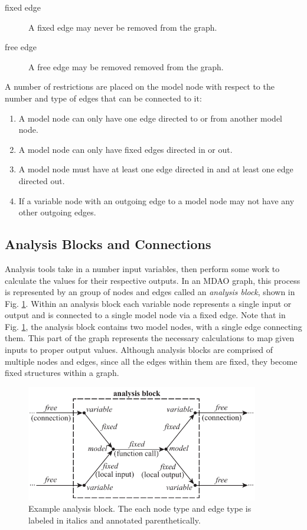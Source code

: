 \begin{description}
\item[fixed edge] A fixed edge may never be removed from the graph.
\item[free edge] A free edge may be removed removed from the graph.
\end{description}

A number of restrictions are placed on the model node with respect to the number and 
type of edges that can be connected to it: 
\begin{enumerate}
\item A model node can only have one edge directed to or from another model node.
\item A model node can only have fixed edges directed in or out.
\item A model node must have at least one edge directed in and at least one edge directed out.
\item If a variable node with an outgoing edge to a model node may not have any other outgoing edges.
\end{enumerate}

\subsection{Analysis Blocks and Connections}

Analysis tools take in a number input variables, then perform some work to calculate 
the values for their respective outputs. In an MDAO graph, this process is 
represented by an group of nodes and edges called an \emph{analysis block}, 
shown in Fig. \ref{f:analysis block}. Within an analysis block each variable 
node represents a single input or output and is connected 
to a single model node via a fixed edge. Note that in Fig. \ref{f:analysis block}, 
the analysis block contains two model nodes, with a single edge connecting them. 
This part of the graph represents the necessary calculations to map given inputs 
to proper output values. Although analysis blocks are comprised of multiple nodes and edges, since all 
the edges within them are fixed, they become fixed structures within a graph.

\begin{figure}[htb!]
    \begin{center}
    \includegraphics[width=4in]{images/analysis_block}
    \end{center}
    \vspace{-10pt}
\caption{Example analysis block. The each node type and edge type is labeled in italics and annotated parenthetically.}
\label{f:analysis block}
\end{figure}

